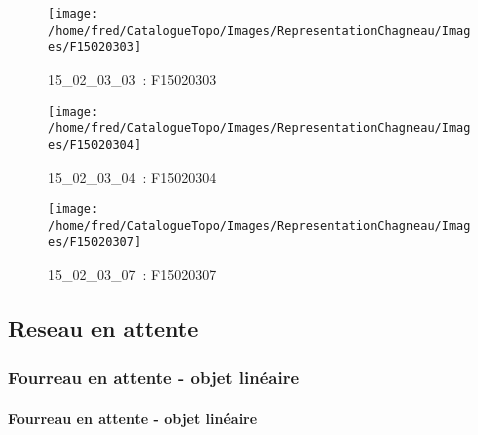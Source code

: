 \documentclass[12pt,titlepage,oneside]{book}
\begin{document}
\begin{figure}[h!]
  \hfill         %
  \begin{minipage}[t]{3cm}
    \begin{center}
      \texttt{[image: /home/fred/CatalogueTopo/Images/RepresentationChagneau/Images/F15020303]}
      \caption[~15\_02\_03\_03]{\small{15\_02\_03\_03~:} \tiny{F15020303}}\label{F15020303}
    \end{center}
  \end{minipage}
  \begin{minipage}[t]{3cm}
    \begin{center}
      \texttt{[image: /home/fred/CatalogueTopo/Images/RepresentationChagneau/Images/F15020304]}
      \caption[~15\_02\_03\_04]{\small{15\_02\_03\_04~:} \tiny{F15020304}}\label{F15020304}
    \end{center}
  \end{minipage}
  \begin{minipage}[t]{3cm}
    \begin{center}
      \texttt{[image: /home/fred/CatalogueTopo/Images/RepresentationChagneau/Images/F15020307]}
      \caption[~15\_02\_03\_07]{\small{15\_02\_03\_07~:} \tiny{F15020307}}\label{F15020307}
    \end{center}
  \end{minipage}
\end{figure}
\subsection{Reseau en attente}
\subsubsection{\large Fourreau en attente - objet linéaire}
\paragraph{Fourreau en attente - objet linéaire}
\noindent
\vspace{\baselineskip}
\end{document}
